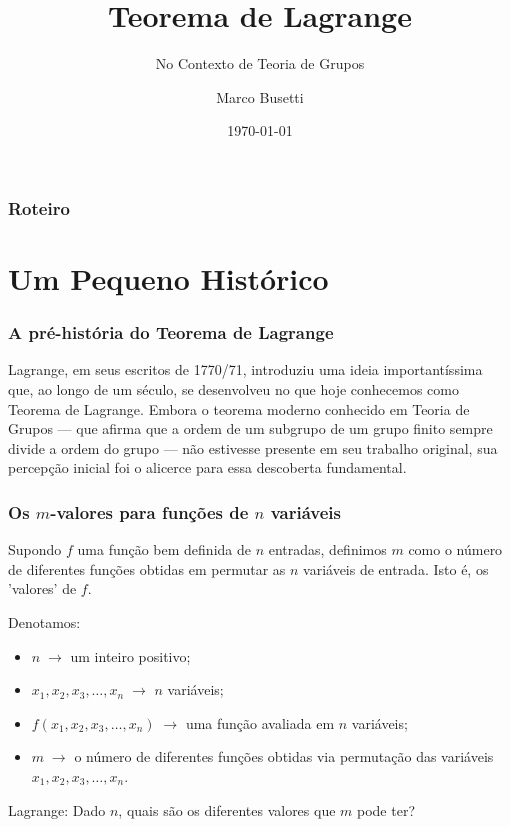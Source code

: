 \documentclass{beamer}
\title{Teorema de Lagrange}
\subtitle{No Contexto de Teoria de Grupos}
\author{Marco Busetti}
\institute{UTFPR}
\date{\today}
\begin{document}
\frame{\titlepage}

\begin{frame}
\frametitle{Roteiro}
\tableofcontents
\end{frame}

\section{Um Pequeno Histórico}

\begin{frame}
\frametitle{A pré-história do Teorema de Lagrange}
\begin{justify}
\fontsize{15}{16}\selectfont
Lagrange, em seus escritos de 1770/71, introduziu uma ideia importantíssima que, ao longo de um século, se desenvolveu no que hoje conhecemos como Teorema de Lagrange. Embora o teorema moderno conhecido em Teoria de Grupos — que afirma que a ordem de um subgrupo de um grupo finito sempre divide a ordem do grupo — não estivesse presente em seu trabalho original, sua percepção inicial foi o alicerce para essa descoberta fundamental.
\end{justify}
\end{frame}

\begin{frame}
\fontsize{15}{16}\selectfont
\frametitle{Os $m$-valores para funções de $n$ variáveis}
\begin{justify}
Supondo $f$ uma função bem definida de $n$ entradas, definimos $m$ como o número de diferentes funções obtidas em permutar as $n$ variáveis de entrada. Isto é, os 'valores' de $f$.
\end{justify}
Denotamos:
\begin{itemize} 
\item $n\;\rightarrow$ um inteiro positivo;

\item $x_1, x_2, x_3, \ldots, x_n\;\rightarrow$ $n$ variáveis;

\item $f(x_1,x_2,x_3, \ldots, x_n)\;\rightarrow$ uma função avaliada em $n$ variáveis;

\item $m\; \rightarrow$ o número de diferentes funções obtidas via permutação das variáveis $x_1, x_2, x_3, \ldots, x_n$.

\end{itemize}
{\color{blue} Lagrange:} Dado $n$, quais são os diferentes valores que $m$ pode ter? 

\end{frame}
\end{document}
